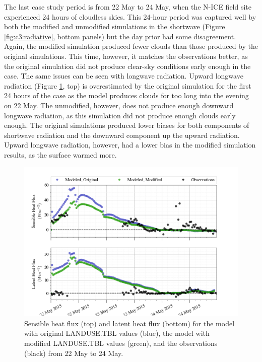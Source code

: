 {The last case study period is from 22 May to 24 May, when the N-ICE field site experienced 24 hours of cloudless skies. This 24-hour period was captured well by both the modified and unmodified simulations in the shortwave (Figure \ref{fig:c3:radiative}, bottom panels) but the day prior had some disagreement. Again, the modified simulation produced fewer clouds than those produced by the original simulations. This time, however, it matches the observations better, as the original simulation did not produce clear-sky conditions early enough in the case. The same issues can be seen with longwave radiation. Upward longwave radiation (Figure \ref{fig:c3:heat}, top) is overestimated by the original simulation for the first 24 hours of the case as the model produces clouds for too long into the evening on 22 May. The unmodified, however, does not produce enough downward longwave radiation, as this simulation did not produce enough clouds early enough. The original simulations produced lower biases for both components of shortwave radiation and the downward component up the upward radiation. Upward longwave radiation, however, had a lower bias in the modified simulation results, as the surface warmed more. 

\begin{figure}[h]
    \centering
    \includegraphics[width=1\linewidth]{figures/chapter6/case3_sensible_latent.png}
    \caption[Idealized Case 3 - Latent and sensible heat fluxes.]{Sensible heat flux (top) and latent heat flux (bottom) for the model with original LANDUSE.TBL values (blue), the model with modified LANDUSE.TBL values (green), and the observations (black) from 22 May to 24 May.}
    \label{fig:c3:heat}
\end{figure}

}
